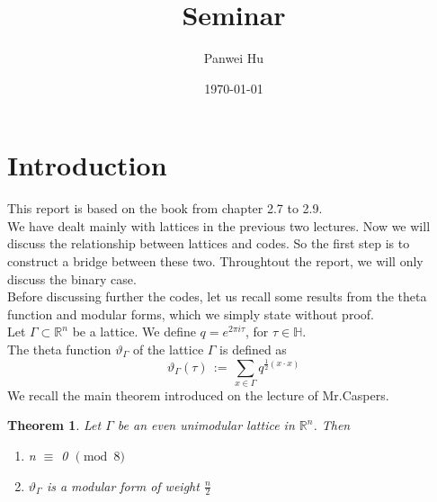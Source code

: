 \documentclass{article}
\title{Seminar}
\date{\today}
\author{Panwei Hu}
\newtheorem{theorem}{Theorem}[section]
\numberwithin{equation}{theorem}
\numberwithin{figure}{theorem}
\newcommand{\thetaFunction}[1]{\ensuremath{\vartheta_{#1}}}
\newcommand{\Real}{\ensuremath{\mathbb{R}}}
\newcommand{\imaginary}{\ensuremath{i}}
\newcommand{\HalfPlane}{\ensuremath{\mathbb{H}}}
\begin{document}
  \maketitle
  \newpage

\tableofcontents
	\newpage
  \newpage
\newpage
\section{Introduction}

This report is based on the book \cite{ebeling2013lattices} from chapter 2.7 to 2.9.\\ 
We have dealt mainly with lattices in the previous two lectures. Now we will discuss the relationship between lattices and codes. So the first step is to construct a bridge between these two. Throughtout the report, we will only discuss the binary case.\\
Before discussing further the codes, let us recall some results from the theta function and modular forms, which we simply state without proof.\\
Let $\Gamma \subset \Real^n$ be a lattice. We define $q = e^{2\pi\imaginary\tau}$, for $\tau \in \HalfPlane$.\\
The theta function $\thetaFunction{\Gamma}$ of the lattice $\Gamma$ is defined as 
\[
	\thetaFunction{\Gamma}(\tau) \, := \,\sum_{x \in \Gamma} q^{\frac{1}{2}(x\cdot x)} 
\] 
We recall the main theorem introduced on the lecture of Mr.Caspers. 
\begin{theorem}\label{evenUniLattice}
Let $\Gamma$ be an even unimodular lattice in $\Real^n$. Then
\begin{enumerate}
	\item n $\equiv$ 0 $\pmod 8$
	\item {\thetaFunction{\Gamma}} is a modular form of weight $\frac{n}{2}$
\end{enumerate}
\end{theorem}
\end{document}
